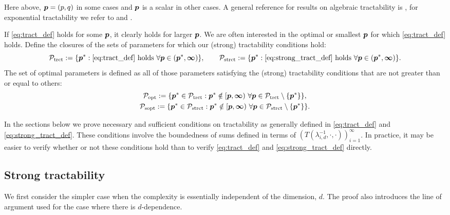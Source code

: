 \documentclass[11pt,a4paper]{article}
\begin{document}
Here above, $\boldsymbol{p} = (p,q)$ in some cases and $\boldsymbol{p}$ is a scalar in other cases. A general reference
for results on algebraic tractability is \cite{NW08}, for exponential tractability we refer to \cite{HKW19} and \cite{KW19}.

If \eqref{eq:tract_def} holds for some $\boldsymbol{p}$, it clearly holds for larger $\boldsymbol{p}$.  We are often interested in the optimal or smallest $\boldsymbol{p}$ for which \eqref{eq:tract_def} holds.  Define the closures of the sets of parameters for which our (strong) tractability conditions hold:
\begin{equation*}
	\mathcal{P}_{\textup{trct}} : = \{\boldsymbol{p}^* : \eqref{eq:tract_def} \text{ holds }\forall \boldsymbol{p} \in (\boldsymbol{p}^*,\boldsymbol{\infty})\}, \qquad
	\mathcal{P}_{\textup{strct}} : = \{\boldsymbol{p}^* : \eqref{eq:strong_tract_def} \text{ holds }\forall \boldsymbol{p} \in (\boldsymbol{p}^*,\boldsymbol{\infty})\}.
\end{equation*}
The  set of optimal parameters is defined as all of those parameters satisfying the (strong) tractability conditions that are not greater than or equal to others:
\begin{gather}
	\label{eq:Poptdef}
	\mathcal{P}_{\textup{opt}} : = \{\boldsymbol{p}^* \in \mathcal{P}_{\textup{trct}} :  \boldsymbol{p}^* \notin [\boldsymbol{p},\boldsymbol{\infty}) \ \forall \boldsymbol{p} \in  \mathcal{P}_{\textup{trct}} \setminus \{\boldsymbol{p}^*\} \}, \\
	\label{eq:Psoptdef}
	\mathcal{P}_{\textup{sopt}} : = \{\boldsymbol{p}^* \in \mathcal{P}_{\textup{strct}} :  \boldsymbol{p}^* \notin [\boldsymbol{p},\boldsymbol{\infty}) \ \forall \boldsymbol{p} \in  \mathcal{P}_{\textup{strct}} \setminus \{\boldsymbol{p}^*\} \}.
\end{gather}

In the sections below we prove necessary and sufficient conditions on tractability as generally defined in \eqref{eq:tract_def} and \eqref{eq:strong_tract_def}.  These conditions involve the boundedness of sums defined in terms of $(T(\lambda_{i,d}^{-1},\cdot, \cdot))_{i=1}^\infty$.  In practice, it may be easier to verify whether or not these conditions hold than to verify \eqref{eq:tract_def} and \eqref{eq:strong_tract_def} directly.




\subsection{Strong tractability}

We first consider the simpler case when the complexity is essentially independent of the dimension, $d$.  The proof also introduces the line of argument used for the case where there is $d$-dependence.
\end{document}

